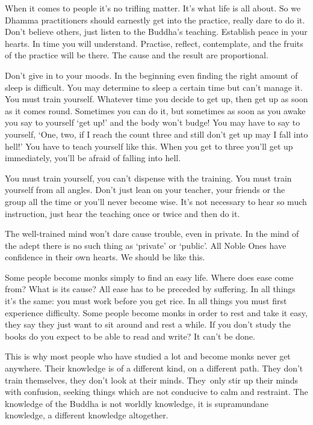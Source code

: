 When it comes to people it's no trifling matter. It's what life is all about. So we Dhamma practitioners should earnestly get into the practice, really dare to do it. Don't believe others, just listen to the Buddha's teaching. Establish peace in your hearts. In time you will understand. Practise, reflect, contemplate, and the fruits of the practice will be there. The cause and the result are proportional. 

Don't give in to your moods. In the beginning even finding the right amount of sleep is difficult. You may determine to sleep a certain time but can't manage it. You must train yourself. Whatever time you decide to get up, then get up as soon as it comes round. Sometimes you can do it, but sometimes as soon as you awake you say to yourself `get up!' and the body won't budge! You may have to say to yourself, `One, two, if I reach the count three and still don't get up may I fall into hell!' You have to teach yourself like this. When you get to three you'll get up immediately, you'll be afraid of falling into hell. 

You must train yourself, you can't dispense with the training. You must train yourself from all angles. Don't just lean on your teacher, your friends or the group all the time or you'll never become wise. It's not necessary to hear so much instruction, just hear the teaching once or twice and then do it. 

The well-trained mind won't dare cause trouble, even in private. In the mind of the adept there is no such thing as `private' or `public'. All Noble Ones have confidence in their own hearts. We should be like this. 

Some people become monks simply to find an easy life. Where does ease come from? What is its cause? All ease has to be preceded by suffering. In all things it's the same: you must work before you get rice. In all things you must first experience difficulty. Some people become monks in order to rest and take it easy, they say they just want to sit around and rest a while. If you don't study the books do you expect to be able to read and write? It can't be done. 

This is why most people who have studied a lot and become monks never get anywhere. Their knowledge is of a different kind, on a \mbox{different} path. They don't train themselves, they don't look at their minds. They~only stir up their minds with confusion, seeking things which are not conducive to calm and restraint. The knowledge of the Buddha is not worldly knowledge, it is supramundane knowledge, a different knowledge altogether. 


